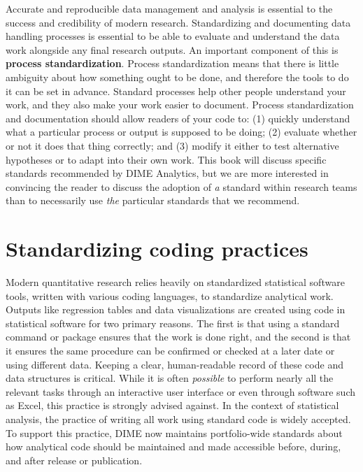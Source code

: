 Accurate and reproducible data management and analysis
is essential to the success and credibility of modern research.
Standardizing and documenting data handling processes is essential
to be able to evaluate and understand
the data work alongside any final research outputs.
An important component of this is \textbf{process standardization}.
Process standardization means that there is
little ambiguity about how something ought to be done,
and therefore the tools to do it can be set in advance.
Standard processes help other people understand your work,
and they also make your work easier to document.
Process standardization and documentation should allow readers of your code to:
(1) quickly understand what a particular process or output is supposed to be doing;
(2) evaluate whether or not it does that thing correctly; and
(3) modify it either to test alternative hypotheses or to adapt into their own work.
This book will discuss specific standards recommended by DIME Analytics,
but we are more interested in convincing the reader
to discuss the adoption of \textit{a} standard within research teams
than to necessarily use \textit{the} particular standards that we recommend.


\section{Standardizing coding practices}

Modern quantitative research relies heavily
on standardized statistical software tools,
written with various coding languages, to standardize analytical work.
Outputs like regression tables and data visualizations
are created using code in statistical software for two primary reasons.
The first is that using a standard command or package ensures that the work is done right,
and the second is that it ensures the same procedure can be confirmed or checked
at a later date or using different data.
Keeping a clear, human-readable record of these code and data structures is critical.
While it is often \textit{possible} to perform nearly all the relevant tasks
through an interactive user interface or even through software such as Excel,
this practice is strongly advised against.
In the context of statistical analysis,
the practice of writing all work using standard code is widely accepted.
To support this practice, DIME now maintains portfolio-wide standards
about how analytical code should be maintained and made accessible
before, during, and after release or publication.

